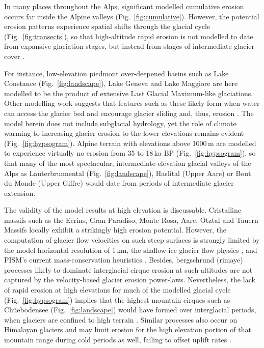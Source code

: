 \documentclass[esurf, manuscript]{copernicus}
\begin{document}
    In many places throughout the Alps, significant modelled cumulative erosion
    occurs far inside the Alpine valleys (Fig.~\ref{fig:cumulative}). However,
    the potential erosion patterns experience spatial shifts through the
    glacial cycle (Fig.~\ref{fig:transects}), so that high-altitude rapid
    erosion is not modelled to date from expansive glaciation stages, but
    instead from stages of intermediate glacier cover
    \citep[Fig.~\ref{fig:hypsogram};][]{Barr.etal.2019}.

    For instance, low-elevation piedmont over-deepened basins such as Lake
    Constance (Fig.~\ref{fig:landscape}), Lake Geneva and Lake Maggiore are
    here modelled to be the product of extensive Last Glacial Maximum-like
    glaciations. Other modelling work suggests that features such as these
    likely form when water can access the glacier bed and encourage glacier
    sliding and, thus, erosion \citep{Herman.etal.2011}. The model herein does
    not include subglacial hydrology, yet the role of climate warming to
    increasing glacier erosion to the lower elevations remains evident
    (Fig.~\ref{fig:hypsogram}).
    Alpine terrain with elevations above 1000\,m are modelled to
    experience virtually no erosion from 35 to 18\,ka BP
    (Fig.~\ref{fig:hypsogram}), so that many of the most spectacular,
    intermediate-elevation glacial valleys of the Alps as Lauterbrunnental
    (Fig.~\ref{fig:landscape}), Haslital (Upper Aare) or Bout du Monde (Upper
    Giffre) would date from periods of intermediate glacier extension.

    The validity of the model results at high elevation is discussable.
    Cristalline massifs such as the Ecrins, Gran Paradiso, Monte Rosa, Aare,
    \"Otztal and Tauern Massifs locally exhibit a strikingly high erosion
    potential. However, the computation of glacier flow velocities on such
    steep surfaces is strongly limited by the model horizontal resolution of
    1\,km, the shallow-ice glacier flow physics \citep{Imhof.etal.2019}, and
    PISM's current mass-conservation heuristics \citep{Imhof.2021}. Besides,
    bergschrund (rimaye) processes likely to dominate interglacial cirque
    erosion at such altitudes \citep{Sanders.etal.2012} are not captured by the
    velocity-based glacier erosion power-laws. Nevertheless,
    the lack of rapid erosion at high elevations for much of the modelled
    glacial cycle (Fig.~\ref{fig:hypsogram}) implies that the highest mountain
    cirques such as Ch\"uebodensee (Fig.~\ref{fig:landscape}) would have formed
    over interglacial periods, when glaciers are confined to high terrain
    \citep{Barr.etal.2017, Barr.etal.2019}. Similar processes also occur on
    Himalayan glaciers and may limit erosion for the high elevation portion of
    that mountain range during cold periods as well, failing to offset uplift
    rates \citep{Harper.Humphrey.2003}.
\end{document}
